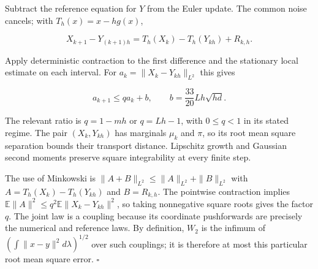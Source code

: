 \documentclass[11pt,a4paper]{article}
\begin{document}
Subtract the reference equation for \(Y\) from the Euler update. The common noise cancels; with \(T_h(x)=x-hg(x)\),

\[X_{k+1}-Y_{(k+1)h}=T_h(X_k)-T_h(Y_{kh})+R_{k,h}.\]

Apply deterministic contraction \cite[Section~3.10.9]{LangevinLean2026ULASC} to the first difference and the stationary local estimate \cite[Section~3.11.9]{LangevinLean2026ULASC} on each interval. For \(a_k=\|X_k-Y_{kh}\|_{L^2}\) this gives

\[a_{k+1}\le q a_k+b,\qquad b=\frac{33}{20}Lh\sqrt{hd}.\]

The relevant ratio is \(q=1-mh\) or \(q=Lh-1\), with \(0\le q<1\) in its stated regime. The pair \((X_k,Y_{kh})\) has marginals \(\mu_k\) and \(\pi\), so its root mean square separation bounds their transport distance. Lipschitz growth and Gaussian second moments preserve square integrability at every finite step.




The use of Minkowski is \(\|A+B\|_{L^2}\le\|A\|_{L^2}+\|B\|_{L^2}\) with \(A=T_h(X_k)-T_h(Y_{kh})\) and \(B=R_{k,h}\). The pointwise contraction implies \(\mathbb E\|A\|^2\le q^2\mathbb E\|X_k-Y_{kh}\|^2\), so taking nonnegative square roots gives the factor \(q\). The joint law is a coupling because its coordinate pushforwards are precisely the numerical and reference laws. By definition, \(W_2\) is the infimum of \((\int\|x-y\|^2d\lambda)^{1/2}\) over such couplings; it is therefore at most this particular root mean square error. \(\square\)
\end{document}
